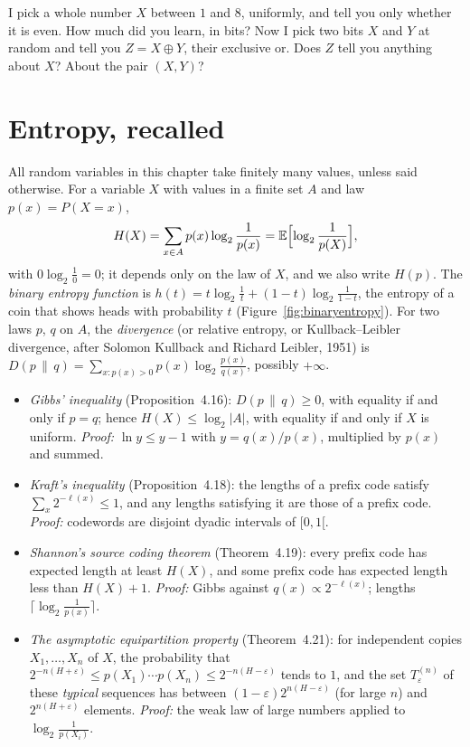 \begin{think}
I pick a whole number $X$ between $1$ and $8$, uniformly, and tell you only whether it is even. How much did you learn, in bits? Now I pick two bits $X$ and $Y$ at random and tell you $Z=X\oplus Y$, their exclusive or. Does $Z$ tell you anything about $X$? About the pair $(X,Y)$?
\end{think}

\section{Entropy, recalled}\label{sec:recall}

All random variables in this chapter take finitely many values, unless said otherwise. For a variable $X$ with values in a finite set $A$ and law $p(x)=P(X=x)$,
\[
H(X)=\sum_{x\in A}p(x)\log_2\frac1{p(x)}=\mathbb E\Bigl[\log_2\frac1{p(X)}\Bigr],
\]
with $0\log_2\frac10=0$; it depends only on the law of $X$, and we also write $H(p)$. The \emph{binary entropy function} is $h(t)=t\log_2\frac1t+(1-t)\log_2\frac1{1-t}$, the entropy of a coin that shows heads with probability $t$ (Figure~\ref{fig:binaryentropy}). For two laws $p$, $q$ on $A$, the \emph{divergence} (or relative entropy, or Kullback--Leibler divergence, after Solomon Kullback and Richard Leibler, 1951) is $D(p\,\|\,q)=\sum_{x:p(x)>0}p(x)\log_2\frac{p(x)}{q(x)}$, possibly $+\infty$.

\begin{reminder}[title={Reminder (Tome~3, Chapter~4)}]
\begin{itemize}
\item \emph{Gibbs' inequality} (Proposition~4.16): $D(p\,\|\,q)\ge0$, with equality if and only if $p=q$; hence $H(X)\le\log_2|A|$, with equality if and only if $X$ is uniform. \emph{Proof:} $\ln y\le y-1$ with $y=q(x)/p(x)$, multiplied by $p(x)$ and summed.
\item \emph{Kraft's inequality} (Proposition~4.18): the lengths of a prefix code satisfy $\sum_x2^{-\ell(x)}\le1$, and any lengths satisfying it are those of a prefix code. \emph{Proof:} codewords are disjoint dyadic intervals of $[0,1[$.
\item \emph{Shannon's source coding theorem} (Theorem~4.19): every prefix code has expected length at least $H(X)$, and some prefix code has expected length less than $H(X)+1$. \emph{Proof:} Gibbs against $q(x)\propto2^{-\ell(x)}$; lengths $\lceil\log_2\frac1{p(x)}\rceil$.
\item \emph{The asymptotic equipartition property} (Theorem~4.21): for independent copies $X_1,\dots,X_n$ of $X$, the probability that $2^{-n(H+\varepsilon)}\le p(X_1)\cdots p(X_n)\le2^{-n(H-\varepsilon)}$ tends to $1$, and the set $T^{(n)}_\varepsilon$ of these \emph{typical} sequences has between $(1-\varepsilon)2^{n(H-\varepsilon)}$ (for large $n$) and $2^{n(H+\varepsilon)}$ elements. \emph{Proof:} the weak law of large numbers applied to $\log_2\frac1{p(X_i)}$.
\end{itemize}
\end{reminder}

